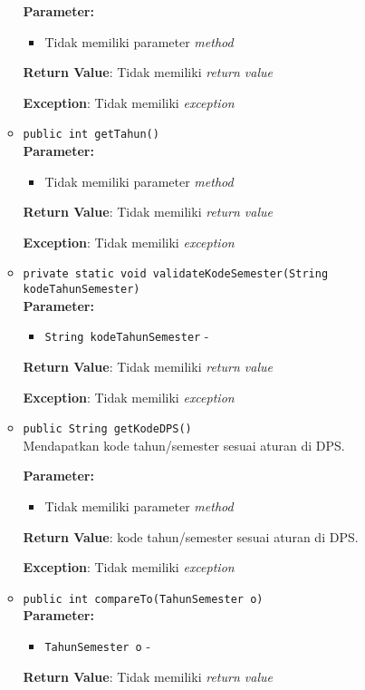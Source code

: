 \documentclass{article}
\begin{document}
\begin{enumerate}
\begin{itemize}
\textbf{Parameter:}\begin{itemize}
\item Tidak memiliki parameter \textit{method}
\end{itemize}
\textbf{Return Value}: Tidak memiliki \textit{return value}

\textbf{Exception}: Tidak memiliki \textit{exception}

\item \texttt{public int getTahun()}\\ 


\textbf{Parameter:}\begin{itemize}
\item Tidak memiliki parameter \textit{method}
\end{itemize}
\textbf{Return Value}: Tidak memiliki \textit{return value}

\textbf{Exception}: Tidak memiliki \textit{exception}

\item \texttt{private static void validateKodeSemester(String kodeTahunSemester)}\\ 


\textbf{Parameter:}\begin{itemize}
\item \texttt{String kodeTahunSemester} - 
\end{itemize}
\textbf{Return Value}: Tidak memiliki \textit{return value}

\textbf{Exception}: Tidak memiliki \textit{exception}

\item \texttt{public String getKodeDPS()}\\ 
Mendapatkan kode tahun/semester sesuai aturan di DPS.

\textbf{Parameter:}\begin{itemize}
\item Tidak memiliki parameter \textit{method}
\end{itemize}
\textbf{Return Value}: kode tahun/semester sesuai aturan di DPS.

\textbf{Exception}: Tidak memiliki \textit{exception}

\item \texttt{public int compareTo(TahunSemester o)}\\ 


\textbf{Parameter:}\begin{itemize}
\item \texttt{TahunSemester o} - 
\end{itemize}
\textbf{Return Value}: Tidak memiliki \textit{return value}


\end{itemize}
\end{enumerate}
\end{document}
